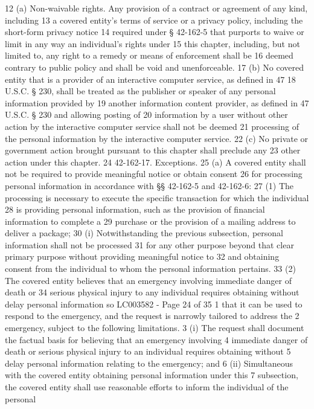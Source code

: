 12 (a) Non-waivable rights. Any provision of a contract or agreement of any kind, including
13 a covered entity's terms of service or a privacy policy, including the short-form privacy notice
14 required under § 42-162-5 that purports to waive or limit in any way an individual's rights under
15 this chapter, including, but not limited to, any right to a remedy or means of enforcement shall be
16 deemed contrary to public policy and shall be void and unenforceable.
17 (b) No covered entity that is a provider of an interactive computer service, as defined in 47
18 U.S.C. § 230, shall be treated as the publisher or speaker of any personal information provided by
19 another information content provider, as defined in 47 U.S.C. § 230 and allowing posting of
20 information by a user without other action by the interactive computer service shall not be deemed
21 processing of the personal information by the interactive computer service.
22 (c) No private or government action brought pursuant to this chapter shall preclude any
23 other action under this chapter.
24 42-162-17. Exceptions.
25 (a) A covered entity shall not be required to provide meaningful notice or obtain consent
26 for processing personal information in accordance with §§ 42-162-5 and 42-162-6:
27 (1) The processing is necessary to execute the specific transaction for which the individual
28 is providing personal information, such as the provision of financial information to complete a
29 purchase or the provision of a mailing address to deliver a package;
30 (i) Notwithstanding the previous subsection, personal information shall not be processed
31 for any other purpose beyond that clear primary purpose without providing meaningful notice to
32 and obtaining consent from the individual to whom the personal information pertains.
33 (2) The covered entity believes that an emergency involving immediate danger of death or
34 serious physical injury to any individual requires obtaining without delay personal information so 
LC003582 - Page 24 of 35
1 that it can be used to respond to the emergency, and the request is narrowly tailored to address the
2 emergency, subject to the following limitations.
3 (i) The request shall document the factual basis for believing that an emergency involving
4 immediate danger of death or serious physical injury to an individual requires obtaining without
5 delay personal information relating to the emergency; and
6 (ii) Simultaneous with the covered entity obtaining personal information under this
7 subsection, the covered entity shall use reasonable efforts to inform the individual of the personal
